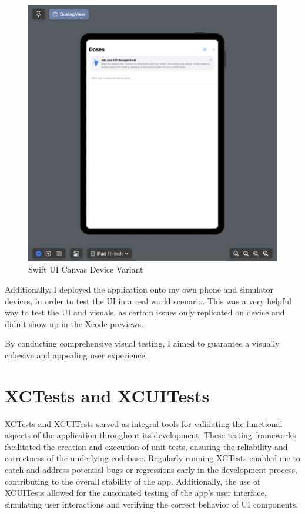 \begin{figure} [H]
    \centering
    \includegraphics[width=0.75\linewidth]{thesis//chapters//images/SwiftUIDeviceVariant.png}
    \caption{Swift UI Canvas Device Variant}
    \label{fig:deviceVar}
\end{figure}

Additionally, I deployed the application onto my own phone and simulator devices, in order to test the UI in a real world scenario. This was a very helpful way to test the UI and visuals, as certain issues only replicated on device and didn't show up in the Xcode previews.

By conducting comprehensive visual testing, I aimed to guarantee a visually cohesive and appealing user experience.

\section{XCTests and XCUITests}

XCTests and XCUITests served as integral tools for validating the functional aspects of the application throughout its development. These testing frameworks facilitated the creation and execution of unit tests, ensuring the reliability and correctness of the underlying codebase. Regularly running XCTests enabled me to catch and address potential bugs or regressions early in the development process, contributing to the overall stability of the app. Additionally, the use of XCUITests allowed for the automated testing of the app's user interface, simulating user interactions and verifying the correct behavior of UI components.

